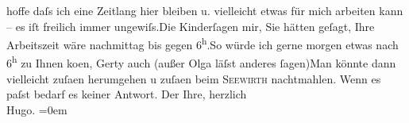 \begin{ledgroupsized}[t]{13cm}
               hoffe daſs ich eine Zeitlang hier bleiben u. vielleicht etwas für mich arbeiten kann
               – es iſt freilich immer ungewiſs.\hspace*{1.5em}Die Kinderſagen mir, Sie hätten {\pb}geſagt, Ihre Arbeitszeit wäre
               nachmittag bis gegen 6\textsuperscript{h}.\hspace*{1.5em}So würde ich gerne morgen etwas nach 6\textsuperscript{h} zu Ihnen ko{\geminationm}en, Gerty auch (außer Olga läſst anderes
                  ſagen)\hspace*{1.5em}Man könnte dann vielleicht zuſa{\geminationm}en herumgehen u zuſa{\geminationm}en
               beim \textsc{Seewirth} nachtmahlen. Wenn es paſst bedarf es keiner Antwort.\pend
           \pstart
           Der Ihre, herzlich{\\[\baselineskip]}\spacefill\mbox{Hugo.}\pend
           \leftskip=0em{}
         
         \endnumbering{}\end{ledgroupsized}  \newcommand{\dateiname}{L02234}\newcommand{\titel}{Hugo von Hofmannsthal an Arthur Schnitzler, 24. 7. [1916]}\newcommand{\editorInnen}{Martin Anton Müller und Gerd-Hermann Susen}
      